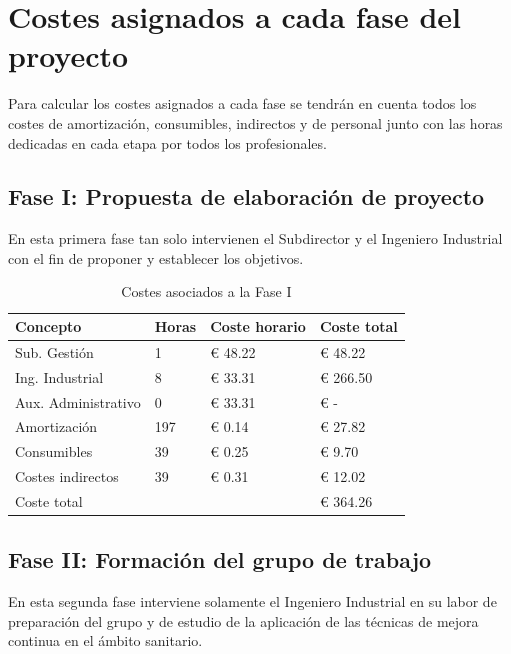 \section{Costes asignados a cada fase del proyecto}

Para calcular los costes asignados a cada fase se tendrán en cuenta todos los costes de amortización, consumibles, indirectos y de personal junto con las horas dedicadas en cada etapa por todos los profesionales.

\subsection{Fase I: Propuesta de elaboración de proyecto}

En esta primera fase tan solo intervienen el Subdirector y el Ingeniero Industrial con el fin de proponer y establecer los objetivos.

\begin{table}[H]
    \centering
    \begin{tabular}{@{}llll@{}}
        \toprule
        Concepto            & Horas & Coste horario & Coste total \\ \midrule
        Sub. Gestión        & 1     & € 48.22       & € 48.22     \\
        Ing. Industrial     & 8     & € 33.31       & € 266.50    \\
        Aux. Administrativo & 0     & € 33.31       & € -         \\
        Amortización        & 197   & € 0.14        & € 27.82     \\
        Consumibles         & 39    & € 0.25        & € 9.70      \\
        Costes indirectos   & 39    & € 0.31        & € 12.02     \\
        \midrule
        Coste total         &       &               & € 364.26    \\
        \bottomrule
    \end{tabular}
    \caption{Costes asociados a la Fase I}
    \label{tab:fase-propuesta}
\end{table}

\subsection{Fase II: Formación del grupo de trabajo}

En esta segunda fase interviene solamente el Ingeniero Industrial en su labor de preparación del grupo y de estudio de la aplicación de las técnicas de mejora continua en el ámbito sanitario.

